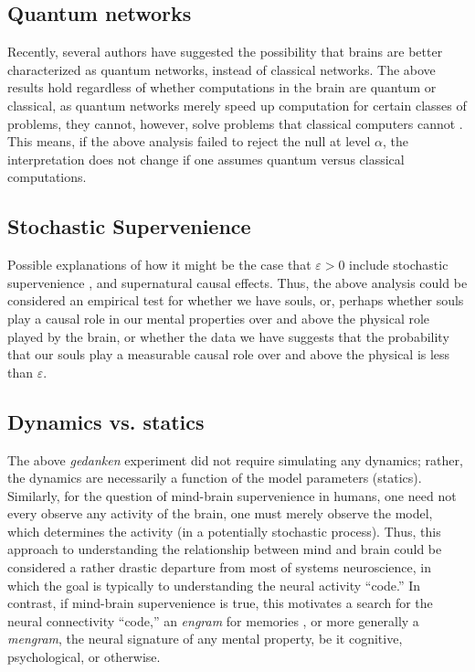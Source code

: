 \documentclass{article}
\newcommand{\eps}{\varepsilon}
\begin{document}

\subsection{Quantum networks} %
\label{par:quantum_networks}

Recently, several authors have suggested the possibility that brains are better characterized as quantum networks, instead of classical networks.  The above results hold regardless of whether computations in the brain are quantum or classical, as quantum networks merely speed up computation for certain classes of problems, they cannot, however, solve problems that classical computers cannot \cite{NielsenChuang00}.  This means, if the above analysis failed to reject the null at level $\alpha$, the interpretation does not change if one assumes quantum versus classical computations.





\subsection{Stochastic Supervenience} %
\label{par:stochastic_supervenience}


Possible explanations of how it might be the case that $\eps>0$ include stochastic supervenience \cite{Craver09}, and supernatural causal effects.  Thus, the above analysis could be considered an empirical test for whether we have souls, or, perhaps whether souls play a causal role in our mental properties over and above the physical role played by the brain, or whether the data we have suggests that the probability that our souls play a measurable causal role over and above the physical is less than $\eps$.



\subsection{Dynamics vs. statics} %
\label{par:dynamics_vs_statics}

The above \emph{gedanken} experiment did not require simulating any dynamics; rather, the dynamics are necessarily a function of the model parameters (statics).  Similarly, for the question of mind-brain supervenience in humans, one need not every observe any activity of the brain, one must merely observe the model, which determines the activity (in a potentially stochastic process). Thus, this approach to understanding the relationship between mind and brain could be considered a rather drastic departure from most of systems neuroscience, in which the goal is typically to understanding the neural activity ``code.''  In contrast, if mind-brain supervenience is true, this motivates a search for the neural connectivity ``code,'' an \emph{engram} for memories \cite{Semon21, Lashley50, ZhangLinden03, ShemaDudai07, BerryDavis08}, or more generally a \emph{mengram}, the neural signature of any mental property, be it cognitive, psychological, or otherwise.  
\end{document}
